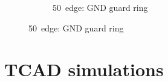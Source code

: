 \begin{figure}[htbp]
\begin{subfigure}[b]{0.33\textwidth}
    \caption{50~\micron edge: GND guard ring}
    \label{fig:GuardRingLayout_50_GND_GR}
  \end{subfigure}
  \label{fig:GuardRingLayout}
\end{figure}

\section{TCAD simulations}


